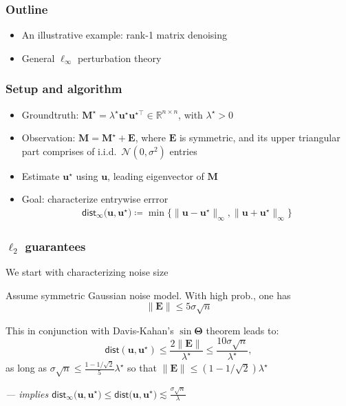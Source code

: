 \documentclass[compress,
mathserif,wide,%
]{beamer}
\begin{document}
\begin{frame}
\frametitle{Outline}

\begin{itemize}
  \itemsep1em
  \item An illustrative example: rank-1 matrix denoising
  \item General $\ell_{\infty}$ perturbation theory
\end{itemize}

\end{frame}





\begin{frame}
	\frametitle{Setup and algorithm}
	
	\begin{itemize}
		\itemsep 0.5em
		\item Groundtruth: $\bm{M}^{\star} = \lambda^{\star} \bm{u}^{\star} \bm{u}^{\star\top}\in \mathbb{R}^{n\times n}$, with $\lambda^\star > 0$
		\item Observation: $\bm{M} = \bm{M}^{\star} + \bm{E}$, where $\bm{E}$ is symmetric, and its upper triangular part comprises of i.i.d.~$\mathcal{N}(0, \sigma^2)$ entries
		\item Estimate $\bm{u}^{\star}$ using $\bm{u}$, leading eigenvector of $\bm{M}$
		\item Goal: characterize entrywise errror
		 \begin{align*}
	\mathsf{dist}_{\infty}\big(\bm{u},\bm{u}^{\star}\big)
	\coloneqq \min\big\{ \|\bm{u}-\bm{u}^{\star}\|_{\infty}, \|\bm{u}+\bm{u}^{\star}\|_{\infty} \big\}
\end{align*}
	\end{itemize}


\end{frame}


\begin{frame}
	\frametitle{$\ell_{2}$ guarantees}
	
	We start with characterizing noise size
	 
	\begin{lemma}
	Assume symmetric Gaussian noise model. With high prob., one has
	\[
	\|\bm{E}\| \leq 5 \sigma \sqrt{n}
	\] 
	\end{lemma}
	
	\vfill 
	This in conjunction with Davis-Kahan's $\sin \bm{\Theta}$ theorem leads to: 
	\[
	\mathsf{dist}(\bm{u}, \bm{u}^{\star}) \leq \frac{2\| \bm{E} \|}{ \lambda^\star } \leq \frac{10\sigma \sqrt{n} }{ \lambda^\star},
	\]
	as long as $\sigma \sqrt{n} \leq \frac{1 - 1/\sqrt{2} }{5} \lambda^\star$ so that $\|\bm{E}\| \leq (1 - 1 / \sqrt{2}) \lambda^\star$
	
	\vfill 
	{\hfill \em \footnotesize --- implies $\mathsf{dist}_{\infty}\big(\bm{u},\bm{u}^{\star}\big) \leq \mathsf{dist}\big(\bm{u},\bm{u}^{\star}\big) \lesssim \frac{\sigma \sqrt{n} }{ \lambda }$  }
\end{frame}
\end{document}
